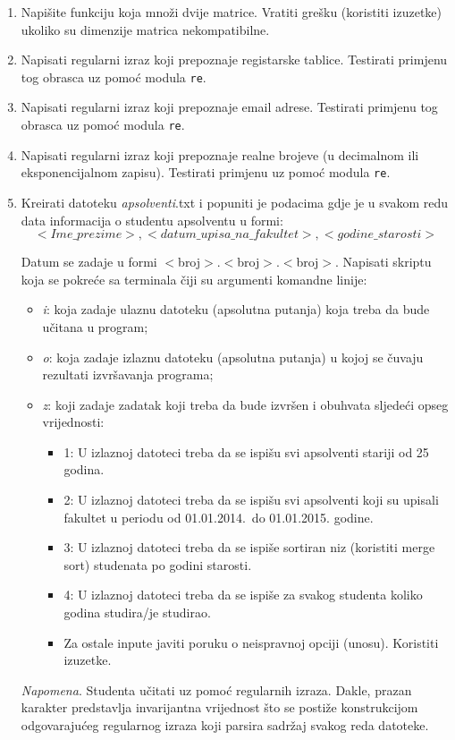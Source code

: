 \begin{enumerate}
	\item Napišite funkciju koja množi dvije matrice. Vratiti grešku (koristiti izuzetke) ukoliko su dimenzije matrica nekompatibilne.  
	 
	\item Napisati regularni izraz koji prepoznaje registarske tablice. Testirati primjenu tog obrasca uz pomoć modula \texttt{re}.
	
	\item Napisati regularni izraz koji prepoznaje email adrese. Testirati primjenu tog obrasca uz pomoć modula \texttt{re}.
	
	\item Napisati regularni izraz koji prepoznaje realne brojeve (u decimalnom ili eksponencijalnom zapisu). Testirati primjenu uz pomoć modula \texttt{re}.
	
	
	\item Kreirati datoteku \textit{apsolventi}.txt i popuniti je podacima gdje je u svakom redu data
	informacija o studentu apsolventu u formi: 
	 $$<Ime\_prezime>, <datum\_upisa\_na\_fakultet>, <godine\_starosti>$$ 
	
	Datum se zadaje u formi $<$broj$>$.$<$broj$>$.$<$broj$>$. Napisati skriptu koja se pokreće sa terminala čiji su argumenti komandne linije:
	\begin{itemize}
		\item  	\textit{i}: koja zadaje ulaznu datoteku (apsolutna putanja) koja treba da bude učitana u
	program;
	     \item \textit{o}: koja zadaje izlaznu datoteku (apsolutna putanja) u kojoj se čuvaju rezultati	izvršavanja programa;
	     \item  \textit{z}: koji zadaje zadatak koji treba da bude izvršen i obuhvata sljedeći opseg vrijednosti: 
	     \begin{itemize}
	     	\item  1: U izlaznoj datoteci treba da se ispišu svi apsolventi stariji od 25 godina.
             \item 2: U izlaznoj datoteci treba da se ispišu svi apsolventi koji su upisali fakultet u periodu od 01.01.2014.\ do 01.01.2015. godine.
	         \item 3: U izlaznoj datoteci treba da se ispiše sortiran niz (koristiti merge sort) studenata po godini starosti.
	         \item 4: U izlaznoj datoteci treba da se ispiše za svakog studenta koliko godina studira/je studirao.
	        \item Za ostale inpute javiti poruku o neispravnoj opciji (unosu). Koristiti izuzetke.
	         \end{itemize}
       \end{itemize}
	\textit{Napomena}. Studenta učitati uz pomoć regularnih izraza. Dakle, prazan karakter predstavlja 
	invarijantna vrijednost što se postiže konstru\-kcijom odgovarajućeg regularnog izraza koji parsira  sadržaj svakog reda  datoteke.
	

\end{enumerate}
